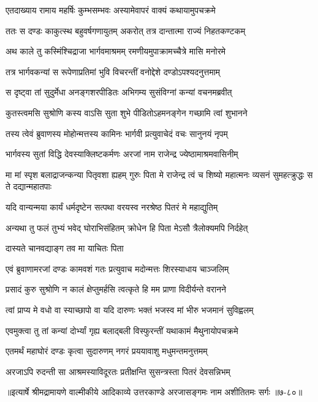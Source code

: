 
\twolineshloka
{एतदाख्याय रामाय महर्षिः कुम्भसम्भवः}
{अस्यामेवापरं वाक्यं कथायामुपचक्रमे} %

\twolineshloka
{ततः स दण्डः काकुत्स्थ बहुवर्षगणायुतम्}
{अकरोत् तत्र दान्तात्मा राज्यं निहतकण्टकम्} %

\twolineshloka
{अथ काले तु कस्मिंश्चिद्राजा भार्गवमाश्रमम्}
{रमणीयमुपाक्रामच्चैत्रे मासि मनोरमे} %

\twolineshloka
{तत्र भार्गवकन्यां स रूपेणाप्रतिमां भुवि}
{विचरन्तीं वनोद्देशे दण्डोऽपश्यदनुत्तमाम्} %

\twolineshloka
{स दृष्ट्वा तां सुदुर्मेधा अनङ्गशरपीडितः}
{अभिगम्य सुसंविग्नां कन्यां वचनमब्रवीत्} %

\twolineshloka
{कुतस्त्वमसि सुश्रोणि कस्य वाऽसि सुता शुभे}
{पीडितोऽहमनङ्गेन गच्छामि त्वां शुभानने} %

\twolineshloka
{तस्य त्वेवं ब्रुवाणस्य मोहोन्मत्तस्य कामिनः}
{भार्गवी प्रत्युवाचेदं वचः सानुनयं नृपम्} %

\twolineshloka
{भार्गवस्य सुतां विद्धि देवस्याक्लिष्टकर्मणः}
{अरजां नाम राजेन्द्र ज्येष्ठामाश्रमवासिनीम्} %

\threelineshloka
{मा मां स्पृश बलाद्राजन्कन्या पितृवशा ह्यहम्}
{गुरुः पिता मे राजेन्द्र त्वं च शिष्यो महात्मनः}
{व्यसनं सुमहत्क्रुद्धः स ते दद्यान्महातपाः} %

\twolineshloka
{यदि वान्यन्मया कार्यं धर्मदृष्टेन सत्पथा}
{वरयस्व नरश्रेष्ठ पितरं मे महाद्युतिम्} %

\twolineshloka
{अन्यथा तु फलं तुभ्यं भवेद् घोराभिसंहितम्}
{क्रोधेन हि पिता मेऽसौ त्रैलोक्यमपि निर्दहेत्} %

\onelineshloka
{दास्यते चानवद्याङ्ग तव मा याचितः पिता} %

\twolineshloka
{एवं ब्रुवाणामरजां दण्डः कामवशं गतः}
{प्रत्युवाच मदोन्मत्तः शिरस्याधाय चाञ्जलिम्} %

\twolineshloka
{प्रसादं कुरु सुश्रोणि न कालं क्षेप्तुमर्हसि}
{त्वत्कृते हि मम प्राणा विदीर्यन्ते वरानने} %

\twolineshloka
{त्वां प्राप्य मे वधो वा स्याच्छापो वा यदि दारुणः}
{भक्तं भजस्व मां भीरु भजमानं सुविह्वलम्} %

\twolineshloka
{एवमुक्त्वा तु तां कन्यां दोर्भ्यां गृह्य बलाद्बली}
{विस्फुरन्तीं यथाकामं मैथुनायोपचक्रमे} %

\twolineshloka
{एतमर्थं महाघोरं दण्डः कृत्वा सुदारुणम्}
{नगरं प्रययावाशु मधुमन्तमनुत्तमम्} %

\twolineshloka
{अरजाऽपि रुदन्ती सा आश्रमस्याविदूरतः}
{प्रतीक्षन्ति सुसन्त्रस्ता पितरं देवसन्निभम्} %


॥इत्यार्षे श्रीमद्रामायणे वाल्मीकीये आदिकाव्ये उत्तरकाण्डे अरजासङ्गमः नाम अशीतितमः सर्गः ॥७-८०॥

